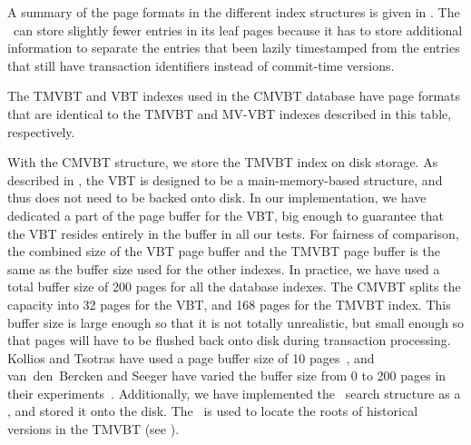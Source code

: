 A summary of the page formats in the different index structures is given in
. 
The \TSBtree\ can store slightly fewer entries in its leaf pages because it has
to store additional information to separate the entries that been lazily
timestamped from the entries that still have transaction identifiers instead
of commit-time versions.

\begin{table}
\begin{center}

%
{The TMVBT and VBT indexes used in the CMVBT database have page formats that
are identical to the TMVBT and MV-VBT indexes described in this table,
respectively.}
\label{table:page-formats}
\end{center}
\end{table}


With the CMVBT structure, we store the TMVBT index on disk storage. 
As described in , the VBT is designed to be a 
main-memory-based structure, and thus does not need to be backed onto disk. 
In our implementation, we have dedicated a part of the page buffer for the
VBT, big enough to guarantee that the VBT resides entirely in the buffer in
all our tests. 
For fairness of comparison, the combined size of the VBT page
buffer and the TMVBT page buffer is the same as the buffer
size used for the other indexes.
In practice, we have used a total buffer size of \num{200} pages for all the 
database indexes.
The CMVBT splits the capacity into \num{32} pages for the VBT,
and \num{168} pages for the TMVBT index.
This buffer size is large enough so that it is not totally unrealistic, but
small enough so that pages will have to be flushed back onto disk during
transaction processing.
Kollios and Tsotras have used a page buffer size of \num{10}
pages~\cite{kollios:2002:hashing}, and van~den~Bercken and Seeger have varied
the buffer size from \num{0} to \num{200} pages in their
experiments~\cite{bercken:1996:multiversion}.
Additionally, we have implemented the \rootstar\ search structure as a
\Btree, and stored it onto the disk.
The \rootstar\ is used to locate the roots of historical versions in
the TMVBT (see ). 

